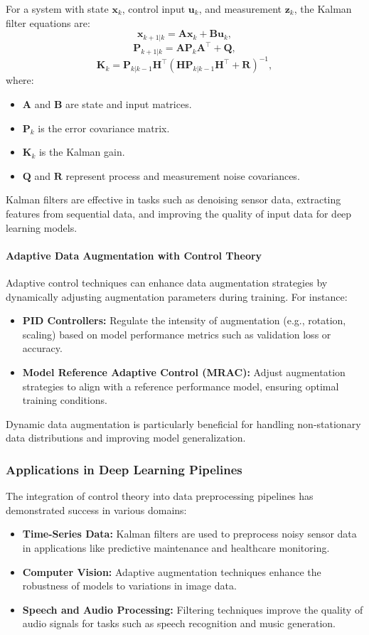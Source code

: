 \documentclass{IEEEojcsys}
\begin{document}
For a system with state $\mathbf{x}_k$, control input $\mathbf{u}_k$, and measurement $\mathbf{z}_k$, the Kalman filter equations are:
\[
\mathbf{x}_{k+1|k} = \mathbf{A}\mathbf{x}_k + \mathbf{B}\mathbf{u}_k,
\]
\[
\mathbf{P}_{k+1|k} = \mathbf{A}\mathbf{P}_k\mathbf{A}^\top + \mathbf{Q},
\]
\[
\mathbf{K}_k = \mathbf{P}_{k|k-1}\mathbf{H}^\top (\mathbf{H}\mathbf{P}_{k|k-1}\mathbf{H}^\top + \mathbf{R})^{-1},
\]
where:
\begin{itemize}
    \item $\mathbf{A}$ and $\mathbf{B}$ are state and input matrices.
    \item $\mathbf{P}_k$ is the error covariance matrix.
    \item $\mathbf{K}_k$ is the Kalman gain.
    \item $\mathbf{Q}$ and $\mathbf{R}$ represent process and measurement noise covariances.
\end{itemize}

Kalman filters are effective in tasks such as denoising sensor data, extracting features from sequential data, and improving the quality of input data for deep learning models.

\paragraph{Adaptive Data Augmentation with Control Theory}
Adaptive control techniques can enhance data augmentation strategies by dynamically adjusting augmentation parameters during training. For instance:
\begin{itemize}
    \item \textbf{PID Controllers:} Regulate the intensity of augmentation (e.g., rotation, scaling) based on model performance metrics such as validation loss or accuracy.
    \item \textbf{Model Reference Adaptive Control (MRAC):} Adjust augmentation strategies to align with a reference performance model, ensuring optimal training conditions.
\end{itemize}

Dynamic data augmentation is particularly beneficial for handling non-stationary data distributions and improving model generalization.

\subsubsection{Applications in Deep Learning Pipelines}
The integration of control theory into data preprocessing pipelines has demonstrated success in various domains:
\begin{itemize}
    \item \textbf{Time-Series Data:} Kalman filters are used to preprocess noisy sensor data in applications like predictive maintenance and healthcare monitoring.
    \item \textbf{Computer Vision:} Adaptive augmentation techniques enhance the robustness of models to variations in image data.
    \item \textbf{Speech and Audio Processing:} Filtering techniques improve the quality of audio signals for tasks such as speech recognition and music generation.
\end{itemize}
\end{document}
